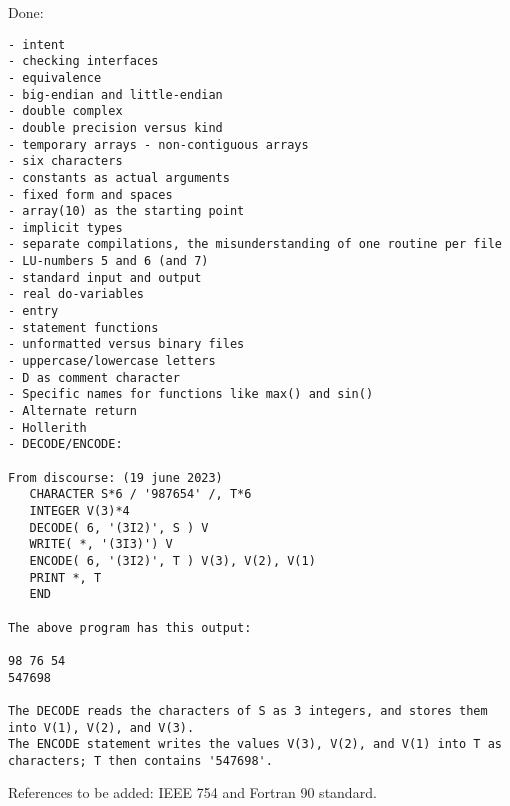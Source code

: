 \documentclass{article}
\begin{document}
Done:
\begin{verbatim}
- intent
- checking interfaces
- equivalence
- big-endian and little-endian
- double complex
- double precision versus kind
- temporary arrays - non-contiguous arrays
- six characters
- constants as actual arguments
- fixed form and spaces
- array(10) as the starting point
- implicit types
- separate compilations, the misunderstanding of one routine per file
- LU-numbers 5 and 6 (and 7)
- standard input and output
- real do-variables
- entry
- statement functions
- unformatted versus binary files
- uppercase/lowercase letters
- D as comment character
- Specific names for functions like max() and sin()
- Alternate return
- Hollerith
- DECODE/ENCODE:

From discourse: (19 june 2023)
   CHARACTER S*6 / '987654' /, T*6
   INTEGER V(3)*4
   DECODE( 6, '(3I2)', S ) V
   WRITE( *, '(3I3)') V
   ENCODE( 6, '(3I2)', T ) V(3), V(2), V(1)
   PRINT *, T
   END

The above program has this output:

98 76 54
547698

The DECODE reads the characters of S as 3 integers, and stores them into V(1), V(2), and V(3).
The ENCODE statement writes the values V(3), V(2), and V(1) into T as characters; T then contains '547698'.

\end{verbatim}


References to be added: IEEE 754 and Fortran 90 standard.



\end{document}
